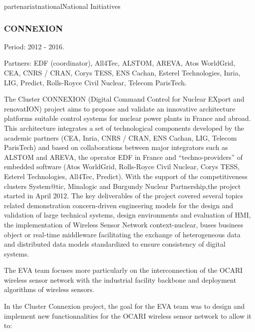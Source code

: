 \documentclass{ra2016}
\begin{document}
\begin{module}{partenariat}{national}{National Initiatives}
\subsubsection{CONNEXION}

\begin{participants}
\end{participants}

Period: 2012 - 2016.

Partners: EDF (coordinator), All4Tec, ALSTOM, AREVA, Atos WorldGrid, CEA, CNRS / CRAN, Corys TESS, ENS Cachan, Esterel Technologies, Inria, LIG, Predict, Rolls-Royce Civil Nuclear, Telecom ParisTech.

The Cluster CONNEXION (Digital Command Control for Nuclear EXport and renovatION) project aims to propose and validate an innovative architecture platforms suitable control systems for nuclear power plants in France and abroad. This architecture integrates a set of technological components developed by the academic partners (CEA, Inria, CNRS / CRAN, ENS Cachan, LIG, Telecom ParisTech) and based on collaborations between major integrators such as ALSTOM and AREVA, the operator EDF in France and ``techno-providers'' of embedded software (Atos WorldGrid, Rolls-Royce Civil Nuclear, Corys TESS, Esterel Technologies, All4Tec, Predict).
With the support of the competitiveness clusters System@tic, Minalogic and Burgundy Nuclear Partnership,the project started in April 2012. The key deliverables of the project covered several topics related demonstration concern-driven engineering models for the design and validation of large technical systems, design environments and evaluation of HMI, the implementation of Wireless Sensor Network context-nuclear, buses business object or real-time middleware facilitating the exchange of heterogeneous data and distributed data models standardized to ensure consistency of digital systems. 

The EVA team focuses more particularly on the interconnection of the OCARI wireless sensor network with the industrial facility backbone and deployment algorithms of wireless sensors.

In the Cluster Connexion project, the goal for the EVA team was to design and implement new functionnalities for the OCARI wireless sensor network to allow it to:


\end{module}
\end{document}

